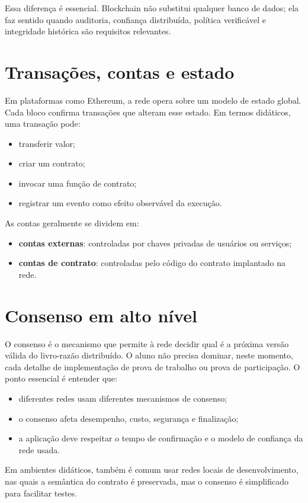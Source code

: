 Essa diferença é essencial. Blockchain não substitui qualquer banco de dados; ela faz sentido quando auditoria, confiança distribuída, política verificável e integridade histórica são requisitos relevantes.

\section{Transações, contas e estado}
Em plataformas como Ethereum, a rede opera sobre um modelo de estado global. Cada bloco confirma transações que alteram esse estado. Em termos didáticos, uma transação pode:
\begin{itemize}[leftmargin=*]
  \item transferir valor;
  \item criar um contrato;
  \item invocar uma função de contrato;
  \item registrar um evento como efeito observável da execução.
\end{itemize}

As contas geralmente se dividem em:
\begin{itemize}[leftmargin=*]
  \item \textbf{contas externas}: controladas por chaves privadas de usuários ou serviços;
  \item \textbf{contas de contrato}: controladas pelo código do contrato implantado na rede.
\end{itemize}

\section{Consenso em alto nível}
O consenso é o mecanismo que permite à rede decidir qual é a próxima versão válida do livro-razão distribuído. O aluno não precisa dominar, neste momento, cada detalhe de implementação de prova de trabalho ou prova de participação. O ponto essencial é entender que:
\begin{itemize}[leftmargin=*]
  \item diferentes redes usam diferentes mecanismos de consenso;
  \item o consenso afeta desempenho, custo, segurança e finalização;
  \item a aplicação deve respeitar o tempo de confirmação e o modelo de confiança da rede usada.
\end{itemize}

Em ambientes didáticos, também é comum usar redes locais de desenvolvimento, nas quais a semântica do contrato é preservada, mas o consenso é simplificado para facilitar testes.

